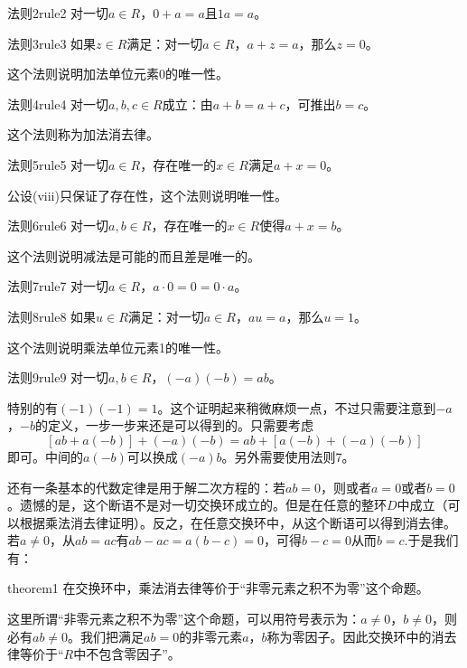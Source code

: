 \begin{corollary}{法则2}{rule2}
对一切$a \in R$，$0+a=a$且$1a=a$。
\end{corollary}

\begin{corollary}{法则3}{rule3}
如果$z \in R$满足：对一切$a \in R$，$a+z=a$，那么$z=0$。
\end{corollary}
这个法则说明加法单位元素0的唯一性。

\begin{corollary}{法则4}{rule4}
对一切$a, b, c \in R$成立：由$a+b=a+c$，可推出$b=c$。
\end{corollary}
这个法则称为加法消去律。

\begin{corollary}{法则5}{rule5}
对一切$a \in R$，存在唯一的$x \in R$满足$a+x=0$。
\end{corollary}
公设(viii)只保证了存在性，这个法则说明唯一性。

\begin{corollary}{法则6}{rule6}
对一切$a, b \in R$，存在唯一的$x \in R$使得$a+x=b$。
\end{corollary}
这个法则说明减法是可能的而且差是唯一的。

\begin{corollary}{法则7}{rule7}
对一切$a \in R$，$a \cdot 0 = 0 = 0 \cdot a$。
\end{corollary}

\begin{corollary}{法则8}{rule8}
如果$u \in R$满足：对一切$a \in R$，$au=a$，那么$u=1$。
\end{corollary}
这个法则说明乘法单位元素1的唯一性。

\begin{corollary}{法则9}{rule9}
对一切$a, b \in R$，$(-a)(-b)=ab$。
\end{corollary}

特别的有$(-1)(-1)=1$。这个证明起来稍微麻烦一点，不过只需要注意到$-a$，$-b$的定义，一步一步来还是可以得到的。只需要考虑
\[
[ab + a(-b)] + (-a)(-b) = ab + [a(-b) + (-a)(-b)]
\]
即可。中间的$a(-b)$可以换成$(-a)b$。另外需要使用法则7。

还有一条基本的代数定律是用于解二次方程的：若$ab=0$，则或者$a=0$或者$b=0$。遗憾的是，这个断语不是对一切交换环成立的。但是在任意的整环$D$中成立（可以根据乘法消去律证明）。反之，在任意交换环中，从这个断语可以得到消去律。若$a \neq 0$，从$ab=ac$有$ab-ac=a(b-c)=0$，可得$b-c=0$从而$b=c$.于是我们有：
\begin{theorem}{}{theorem1}
在交换环中，乘法消去律等价于“非零元素之积不为零”这个命题。
\end{theorem}
这里所谓“非零元素之积不为零”这个命题，可以用符号表示为：$a \neq 0$，$b \neq 0$，则必有$ab \neq 0$。我们把满足$ab=0$的非零元素$a$，$b$称为零因子。因此交换环中的消去律等价于“$R$中不包含零因子”。

